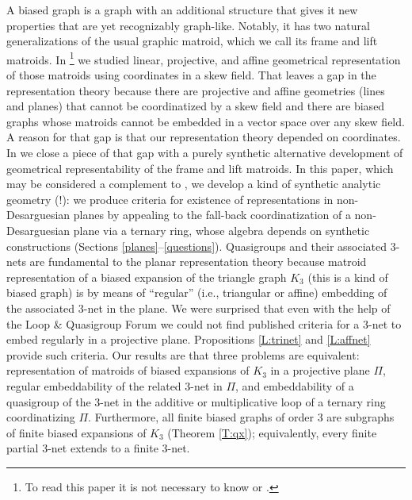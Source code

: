 \documentclass[reqno,12pt]{amsart}
\theoremstyle{remark}
\numberwithin{equation}{section}
\numberwithin{figure}{section}
\newcommand\PP{\Pi}	%
\begin{document}
A biased graph is a graph with an additional structure that gives it new properties that are yet recognizably graph-like.  Notably, it has two natural generalizations of the usual graphic matroid, which we call its frame and lift matroids.  In \cite[Part IV]{BG}\footnote{To read this paper it is not necessary to know \cite{BG} or \cite{BG6}.}   we studied linear, projective, and affine geometrical representation of those matroids using coordinates in a skew field.
That leaves a gap in the representation theory because there are projective and affine geometries (lines and planes) that cannot be coordinatized by a skew field and there are biased graphs whose matroids cannot be embedded in a vector space over any skew field.  
A reason for that gap is that our representation theory depended on coordinates.  
In \cite{BG6} we close a piece of that gap with a purely synthetic alternative development of geometrical representability of the frame and lift matroids.  
In this paper, which may be considered a complement to \cite{BG6}, we develop a kind of synthetic analytic geometry (!): we produce criteria for existence of representations in non-Desarguesian planes by appealing to the fall-back coordinatization of a non-Desarguesian plane via a ternary ring, whose algebra depends on synthetic constructions (Sections \ref{planes}--\ref{questions}).  Quasigroups and their associated $3$-nets are fundamental to the planar representation theory because matroid representation of a biased expansion of the triangle graph $K_3$ (this is a kind of biased graph) is by means of ``regular'' (i.e., triangular or affine) embedding of the associated $3$-net in the plane.  
We were surprised that even with the help of the Loop \& Quasigroup Forum \cite{LQF} we could not find published criteria for a $3$-net to embed regularly in a projective plane.  Propositions \ref{L:trinet} and \ref{L:affnet} provide such criteria.  Our results are that three problems are equivalent:  representation of matroids of biased expansions of $K_3$ in a projective plane $\PP$, regular embeddability of the related $3$-net in $\PP$, and embeddability of a quasigroup of the $3$-net in the additive or multiplicative loop of a ternary ring coordinatizing $\PP$.
Furthermore, all finite biased graphs of order 3 are subgraphs of finite biased expansions of $K_3$ (Theorem \ref{T:qx}); equivalently, every finite partial 3-net extends to a finite 3-net.
\end{document}
